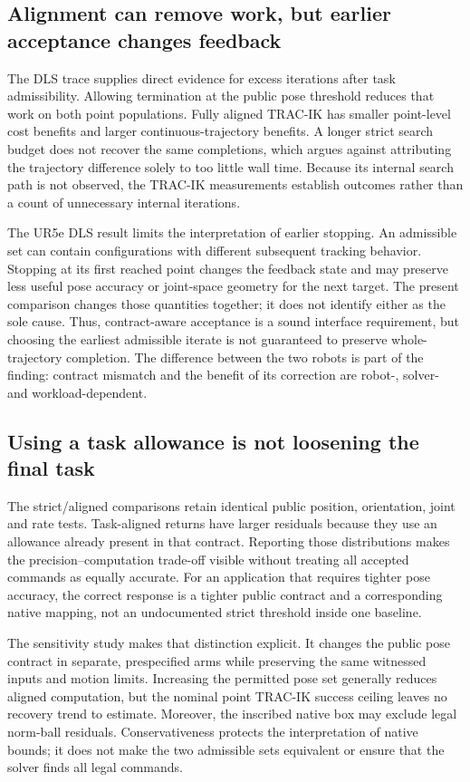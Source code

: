 \documentclass[10pt,a4paper]{article}
\begin{document}
\subsection{Alignment can remove work, but earlier acceptance changes feedback}

The DLS trace supplies direct evidence for excess iterations after task
admissibility. Allowing termination at the public pose threshold reduces that
work on both point populations. Fully aligned TRAC-IK has smaller point-level
cost benefits and larger continuous-trajectory benefits. A longer strict search
budget does not recover the same completions, which argues against attributing
the trajectory difference solely to too little wall time. Because its internal
search path is not observed, the TRAC-IK measurements establish outcomes rather
than a count of unnecessary internal iterations.

The UR5e DLS result limits the interpretation of earlier stopping.
An admissible set can contain configurations with different subsequent tracking
behavior. Stopping at its first reached point changes the feedback state and
may preserve less useful pose accuracy or joint-space geometry for the next
target. The present comparison changes those quantities together; it does not
identify either as the sole cause. Thus, contract-aware acceptance is a sound
interface requirement, but choosing the earliest admissible iterate is not
guaranteed to preserve whole-trajectory completion. The difference between the
two robots is part of the finding: contract mismatch and the benefit of its
correction are robot-, solver- and workload-dependent.

\subsection{Using a task allowance is not loosening the final task}

The strict/aligned comparisons retain identical public position, orientation,
joint and rate tests. Task-aligned returns have larger residuals because they
use an allowance already present in that contract. Reporting those distributions
makes the precision--computation trade-off visible without treating all accepted
commands as equally accurate.
For an application that requires tighter pose accuracy, the correct response
is a tighter public contract and a corresponding native mapping, not an
undocumented strict threshold inside one baseline.

The sensitivity study makes that distinction explicit. It changes the public
pose contract in separate, prespecified arms while preserving the same witnessed
inputs and motion limits. Increasing the permitted pose set generally reduces
aligned computation, but the nominal point TRAC-IK success ceiling leaves no
recovery trend to estimate. Moreover, the inscribed native box may exclude
legal norm-ball residuals. Conservativeness protects the interpretation of
native bounds; it does not make the two admissible sets equivalent or ensure
that the solver finds all legal commands.
\end{document}
